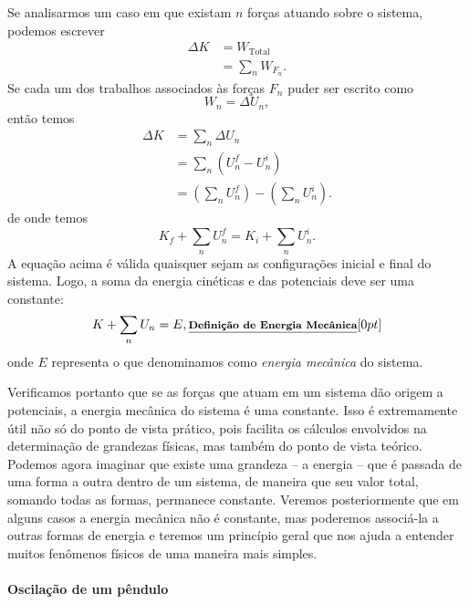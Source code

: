 Se analisarmos um caso em que existam $n$ forças atuando sobre o sistema, podemos escrever
\begin{align}
  \Delta K &= W_{\textrm{Total}} \\
  &= \sum_n W_{F_n}.
\end{align}
%
Se cada um dos trabalhos associados às forças  $F_n$ puder ser escrito como
\begin{equation}
  W_n = \Delta U_n,
\end{equation}
%
então temos
\begin{align}
  \Delta K &= \sum_n \Delta U_n \\
  &= \sum_n (U_n^f - U_n^i) \\
  &= \left(\sum_n U_n^f\right) - \left(\sum_n U_n^i\right).
\end{align}
%
de onde temos
\begin{equation}
  K_f + \sum_n U_n^f = K_i + \sum_n U_n^i.
\end{equation}
%
A equação acima é válida quaisquer sejam as configurações inicial e final do sistema. Logo, a soma da energia cinéticas e das potenciais deve ser uma constante:
\begin{equation}
  K + \sum_n U_n = E, \relax{\footnotesize\emph{\textbf{Definição de Energia Mecânica}}}[0pt]
\end{equation}
%
onde $E$ representa o que denominamos como \emph{energia mecânica} do sistema. 

Verificamos portanto que se as forças que atuam em um sistema dão origem a potenciais, a energia mecânica do sistema é uma constante. Isso é extremamente útil não só do ponto de vista prático, pois facilita os cálculos envolvidos na determinação de grandezas físicas, mas também do ponto de vista teórico. Podemos agora imaginar que existe uma grandeza -- a energia -- que é passada de uma forma a outra dentro de um sistema, de maneira que seu valor total, somando todas as formas, permanece constante. Veremos posteriormente que em alguns casos a energia mecânica não é constante, mas poderemos associá-la a outras formas de energia e teremos um princípio geral que nos ajuda a entender muitos fenômenos físicos de uma maneira mais simples.

\paragraph{Oscilação de um pêndulo}

